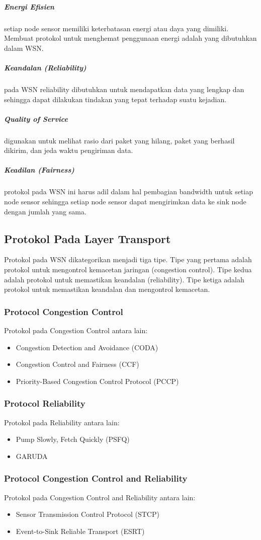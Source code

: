 \subparagraph{Energi Efisien} setiap node sensor memiliki keterbatasan energi atau daya yang dimiliki. Membuat protokol untuk menghemat penggunaan energi adalah yang dibutuhkan dalam WSN.
\subparagraph{Keandalan (Reliability)} pada WSN reliability dibutuhkan untuk mendapatkan data yang lengkap dan sehingga dapat dilakukan tindakan yang tepat terhadap suatu kejadian.
\subparagraph{Quality of Service} digunakan untuk melihat rasio dari paket yang hilang, paket yang berhasil dikirim, dan jeda waktu pengiriman data.
\subparagraph{Keadilan (Fairness)} protokol pada WSN ini harus adil dalam hal pembagian bandwidth untuk setiap node sensor sehingga setiap node sensor dapat mengirimkan data ke sink node dengan jumlah yang sama.

\subsection{Protokol Pada Layer Transport}
Protokol pada WSN dikategorikan menjadi tiga tipe. Tipe yang pertama adalah protokol untuk mengontrol kemacetan jaringan (congestion control). Tipe kedua adalah protokol untuk memastikan keandalan (reliability). Tipe ketiga adalah protokol untuk memastikan keandalan dan mengontrol kemacetan.

\subsubsection{Protocol Congestion Control}
Protokol pada Congestion Control antara lain:
\begin{itemize}
	\item Congestion Detection and Avoidance (CODA)
	\item Congestion Control and Fairness (CCF)
	\item Priority-Based Congestion Control Protocol (PCCP)
\end{itemize}

\subsubsection{Protocol Reliability}
Protokol pada Reliability antara lain:
\begin{itemize}
	\item Pump Slowly, Fetch Quickly (PSFQ)
	\item GARUDA
\end{itemize}

\subsubsection{Protocol Congestion Control and Reliability}
Protokol pada Congestion Control and Reliability antara lain:
\begin{itemize}
	\item Sensor Transmission Control Protocol (STCP)
	\item Event-to-Sink Reliable Transport (ESRT)
\end{itemize}


